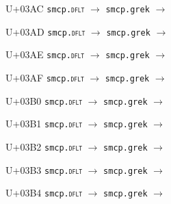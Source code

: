 \documentclass{article}
\begin{document}
\begin{substitutions}
\goodbreak

U+03AC  \linebreak
    \texttt{smcp.\textsc{dflt}} $\to$  \linebreak
    \texttt{smcp.grek} $\to$  

\goodbreak

U+03AD  \linebreak
    \texttt{smcp.\textsc{dflt}} $\to$  \linebreak
    \texttt{smcp.grek} $\to$  

\goodbreak

U+03AE  \linebreak
    \texttt{smcp.\textsc{dflt}} $\to$  \linebreak
    \texttt{smcp.grek} $\to$  

\goodbreak

U+03AF  \linebreak
    \texttt{smcp.\textsc{dflt}} $\to$  \linebreak
    \texttt{smcp.grek} $\to$  

\goodbreak

U+03B0  \linebreak
    \texttt{smcp.\textsc{dflt}} $\to$  \linebreak
    \texttt{smcp.grek} $\to$  

\goodbreak

U+03B1  \linebreak
    \texttt{smcp.\textsc{dflt}} $\to$  \linebreak
    \texttt{smcp.grek} $\to$  

\goodbreak

U+03B2  \linebreak
    \texttt{smcp.\textsc{dflt}} $\to$  \linebreak
    \texttt{smcp.grek} $\to$  

\goodbreak

U+03B3  \linebreak
    \texttt{smcp.\textsc{dflt}} $\to$  \linebreak
    \texttt{smcp.grek} $\to$  

\goodbreak

U+03B4  \linebreak
    \texttt{smcp.\textsc{dflt}} $\to$  \linebreak
    \texttt{smcp.grek} $\to$  


\end{substitutions}
\end{document}
